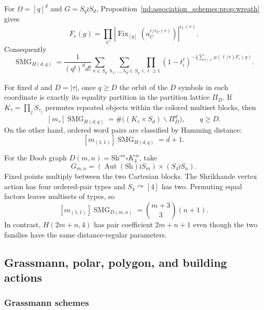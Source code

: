 \documentclass[10pt]{article}
\newcommand{\Fix}{\operatorname{Fix}}
\newcommand{\SMG}{\operatorname{SMG}}
\newcommand{\MGF}{\SMG}
\newcommand{\Aut}{\operatorname{Aut}}
\begin{document}
For $\Omega=[q]^d$ and $G=S_q\wr S_d$, Proposition~\ref{nd:association_schemes:prop:wreath} gives
\begin{equation}\label{nd:association_schemes:eq:hamming-fixed}
 F_r(g)=\prod_C\left|\Fix_{[q]}
 \left(a_C^{r/e_C(r)}\right)\right|^{e_C(r)}.
\end{equation}
Consequently
\begin{equation}\label{nd:association_schemes:eq:hamming-smg}
 \boxed{\MGF_{H(d,q)}=\frac1{(q!)^dd!}\sum_{\pi\in S_d}
 \sum_{h_1,\ldots,h_d\in S_q}\prod_{i,\ell\geq1}
 (1-t_i^\ell)^{-\frac1\ell\sum_{r\mid\ell}\mu(\ell/r)F_r(g)}.}
\end{equation}

For fixed $d$ and $D=|\tau|$, once $q\geq D$ the orbit of the $D$ symbols in
each coordinate is exactly its equality partition in the partition lattice
$\Pi_D$.  If $K_\tau=\prod_jS_{\tau_j}$ permutes repeated objects within the
colored multiset blocks, then
\begin{equation}\label{nd:association_schemes:eq:hamming-stable}
 \boxed{[m_\tau]\MGF_{H(d,q)}
 =\#\bigl((K_\tau\times S_d)\backslash\Pi_D^d\bigr),\qquad q\geq D.}
\end{equation}
On the other hand, ordered word pairs are classified by Hamming distance:
\begin{equation}\label{nd:association_schemes:eq:hamming-pair}
 \boxed{[m_{(1,1)}]\MGF_{H(d,q)}=d+1.}
\end{equation}

For the Doob graph $D(m,n)=\mathrm{Sh}^{\square m}\square K_4^{\square n}$,
take
\[
 G_{m,n}=(\Aut(\mathrm{Sh})\wr S_m)\times(S_4\wr S_n).
\]
Fixed points multiply between the two Cartesian blocks.  The Shrikhande
vertex action has four ordered-pair types and $S_4\curvearrowright[4]$ has
two.  Permuting equal factors leaves multisets of types, so
\begin{equation}\label{nd:association_schemes:eq:doob-pair}
 \boxed{[m_{(1,1)}]\MGF_{D(m,n)}=\binom{m+3}{3}(n+1).}
\end{equation}
In contrast, $H(2m+n,4)$ has pair coefficient $2m+n+1$ even though the two
families have the same distance-regular parameters.

\subsection{Grassmann, polar, polygon, and building actions}

\subsubsection{Grassmann schemes}
\end{document}
